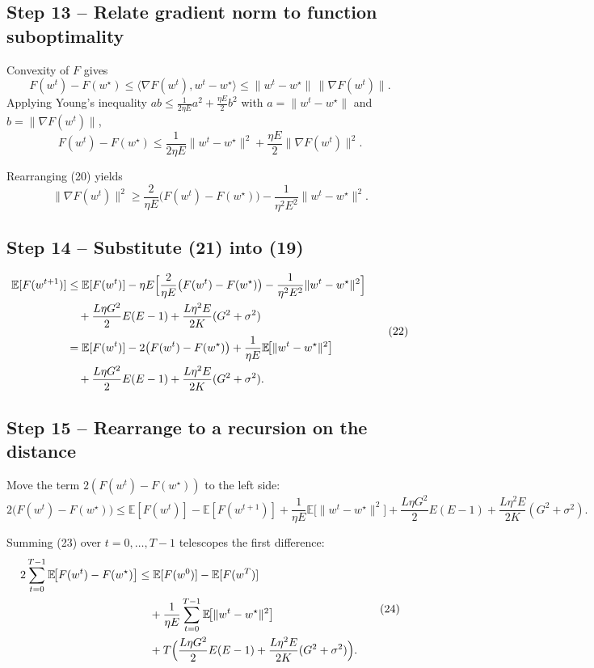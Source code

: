 \documentclass[11pt]{article}
\newcommand{\E}{\mathbb{E}}
\begin{document}
\subsection*{Step 13 – Relate gradient norm to function suboptimality}
Convexity of $F$ gives
\[
F(w^{t})-F(w^\star)\le \langle\nabla F(w^{t}),w^{t}-w^\star\rangle
\le \|w^{t}-w^\star\|\,\|\nabla F(w^{t})\|.
\]
Applying Young’s inequality $ab\le \frac{1}{2\eta E}a^{2}+\frac{\eta E}{2}b^{2}$
with $a=\|w^{t}-w^\star\|$ and $b=\|\nabla F(w^{t})\|$,
\[
F(w^{t})-F(w^\star)\le \frac{1}{2\eta E}\|w^{t}-w^\star\|^{2}
+\frac{\eta E}{2}\|\nabla F(w^{t})\|^{2}.
\tag{20}
\]

Rearranging (20) yields
\[
\|\nabla F(w^{t})\|^{2}\ge \frac{2}{\eta E}\bigl(F(w^{t})-F(w^\star)\bigr)
-\frac{1}{\eta^{2}E^{2}}\|w^{t}-w^\star\|^{2}.
\tag{21}
\]

\subsection*{Step 14 – Substitute (21) into (19)}
\[
\begin{aligned}
\E[F(w^{t+1})]
&\le \E[F(w^{t})]
-\eta E\Bigl[\frac{2}{\eta E}\bigl(F(w^{t})-F(w^\star)\bigr)
-\frac{1}{\eta^{2}E^{2}}\|w^{t}-w^\star\|^{2}\Bigr] \\
&\quad +\frac{L\eta G^{2}}{2}E(E-1)
+\frac{L\eta^{2}E}{2K}(G^{2}+\sigma^{2})\\[4pt]
&= \E[F(w^{t})]
-2\bigl(F(w^{t})-F(w^\star)\bigr)
+\frac{1}{\eta E}\E\!\bigl[\|w^{t}-w^\star\|^{2}\bigr] \\
&\quad +\frac{L\eta G^{2}}{2}E(E-1)
+\frac{L\eta^{2}E}{2K}(G^{2}+\sigma^{2}).
\end{aligned}
\tag{22}
\]

\subsection*{Step 15 – Rearrange to a recursion on the distance}
Move the term $2(F(w^{t})-F(w^\star))$ to the left side:
\[
2\bigl(F(w^{t})-F(w^\star)\bigr)
\le \E[F(w^{t})]-\E[F(w^{t+1})]
+\frac{1}{\eta E}\E\!\bigl[\|w^{t}-w^\star\|^{2}\bigr]
+\frac{L\eta G^{2}}{2}E(E-1)
+\frac{L\eta^{2}E}{2K}(G^{2}+\sigma^{2}).
\tag{23}
\]

Summing (23) over $t=0,\dots,T-1$ telescopes the first difference:
\[
\begin{aligned}
2\sum_{t=0}^{T-1}\E\!\bigl[F(w^{t})-F(w^\star)\bigr]
&\le \E[F(w^{0})]-\E[F(w^{T})] \\
&\quad +\frac{1}{\eta E}\sum_{t=0}^{T-1}
   \E\!\bigl[\|w^{t}-w^\star\|^{2}\bigr] \\
&\quad + T\Bigl(\frac{L\eta G^{2}}{2}E(E-1)
+\frac{L\eta^{2}E}{2K}(G^{2}+\sigma^{2})\Bigr).
\end{aligned}
\tag{24}
\]
\end{document}
